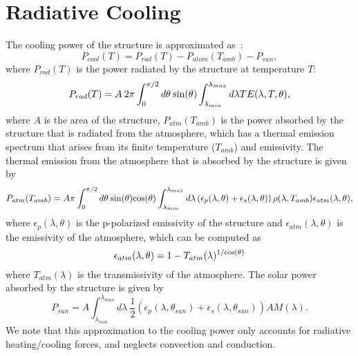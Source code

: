 \documentclass[journal=jpclcd,manuscript=suppinfo]{achemso}
\begin{document}
\section{Radiative Cooling}
The cooling power of the structure is approximated as~\cite{RAZ_Nature_2014}:
\begin{equation}
P_{cool}(T) = P_{rad}(T) - P_{atom}(T_{amb}) - P_{sun},
\end{equation} 
where $P_{rad}(T)$ is the power radiated by the structure at temperature $T$:
\begin{equation}
P_{rad}(T) = A \: 2\pi \int_0^{\pi/2} d\theta \: {\rm sin}(\theta) \int_{\lambda_{min}}^{\lambda_{max}} d\lambda TE(\lambda, T, \theta),
\end{equation}
where $A$ is the area of the structure, $P_{atm}(T_{amb})$ is the power absorbed by the structure that is radiated from the
atmosphere, which has a thermal emission spectrum that arises from its finite temperature ($T_{amb}$) and emissivity.  The
thermal emission from the atmosphere that is absorbed by the structure is given by
\begin{equation}
P_{atm}(T_{amb}) = A\pi \int_0^{\pi/2} d\theta \: {\rm sin}(\theta) {\rm cos}(\theta)\int_{\lambda_{min}}^{\lambda_{max}} 
d\lambda \left(\epsilon_p(\lambda, \theta) + \epsilon_s(\lambda, \theta)  \right) \rho(\lambda, T_{amb}) 
\epsilon_{atm}(\lambda, \theta),
\end{equation}
where $\epsilon_p(\lambda, \theta)$ is the p-polarized emissivity of the structure and $\epsilon_{atm}(\lambda, \theta)$ is the
emissivity of the atmosphere, which can be computed as 
\begin{equation}
\epsilon_{atm}(\lambda, \theta) = 1-T_{atm}(\lambda)^{1/{\rm cos}(\theta)}
\end{equation}
where $T_{atm}(\lambda)$ is the transmissivity of the atmosphere.
The solar power absorbed by the structure is given by 
\begin{equation}
P_{sun} = A \int_{\lambda_{min}}^{\lambda_{max}} d\lambda \: \frac{1}{2} \left( \epsilon_p(\lambda, \theta_{sun}) + \epsilon_s(\lambda, \theta_{sun})\right) AM(\lambda).
\end{equation}
We note that this approximation to the cooling power only accounts for radiative heating/cooling forces, and neglects
convection and conduction.
\end{document}
